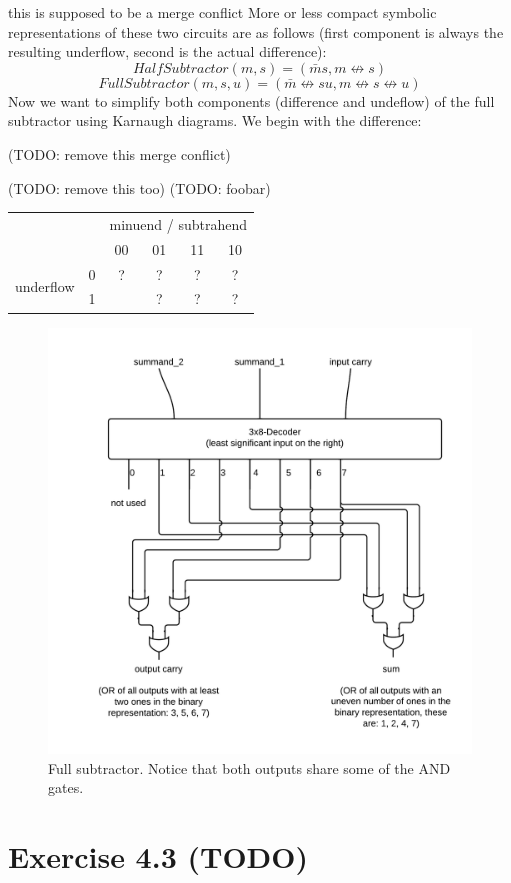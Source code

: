 \documentclass[10pt,a4paper]{scrartcl}
\newcommand{\subExercise}[1]{\vspace{0.5em} \noindent{\bf #1)}}
\begin{document}
this is supposed to be a merge conflict
\subExercise{b} 
More or less compact symbolic representations 
of these two circuits are as follows 
(first component is always the resulting underflow, 
 second is the actual difference):
\[
  HalfSubtractor(m,s) = (\bar m s, m \not\leftrightarrow s)
\]
\[
  FullSubtractor(m,s,u) = 
    (\bar m \not\leftrightarrow su, 
     m \not\leftrightarrow s \not\leftrightarrow u
    )
\]
\subExercise{c} 
Now we want to simplify both components (difference and undeflow) 
of the full subtractor using Karnaugh diagrams. We begin with the
difference:

(TODO: remove this merge conflict)

(TODO: remove this too)
(TODO: foobar)
\vspace{0.5em}
\begin{tabular}{|c c|c c c c|}
  \hline 
    & & \multicolumn{4}{c|}{minuend / subtrahend} \\
    & & 00 & 01 & 11 & 10 \\
  \hline
    \multirow{2}{*}{underflow} & 0 & ? & ? & ? & ? \\
                               & 1 & \cellcolor{red}{?} & ? & ? & ? \\
  \hline
\end{tabular}
 
\subExercise{d}
\vspace{1em}
\begin{figure}[h]
  \centering\includegraphics[width=0.6\linewidth]{images/fullAdder.png}
  \caption{Full subtractor. Notice that both outputs share some of the AND gates.}
\end{figure}
\vspace{1em}


\section*{Exercise 4.3 (TODO)}
\subExercise{a}
\subExercise{b}
\end{document}

